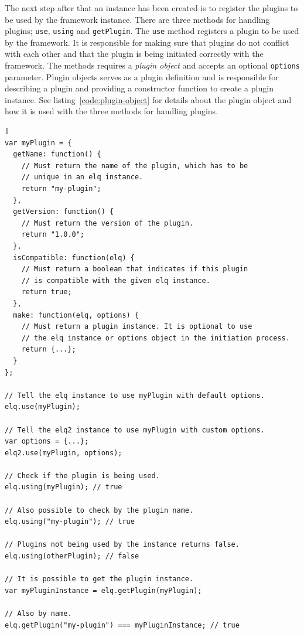 \documentclass[a4paper,11pt]{kth-mag}
\newcommand{\code}[1]{\texttt{#1}}
\begin{document}
          The next step after that an instance has been created is to register the plugins to be used by the framework instance.
          There are three methods for handling plugins; \code{use}, \code{using} and \code{getPlugin}.
          The \code{use} method registers a plugin to be used by the framework.
          It is responsible for making sure that plugins do not conflict with each other and that the plugin is being initiated correctly with the framework.
          The methods requires a \emph{plugin object} and accepts an optional \code{options} parameter.
          Plugin objects serves as a plugin definition and is responsible for describing a plugin and providing a constructor function to create a plugin instance.
          See listing~\ref{code:plugin-object} for details about the plugin object and how it is used with the three methods for handling plugins.

          \begin{lstlisting}[caption={Plugin object definition and examples of handling plugins.},captionpos=b,label={code:plugin-object}]]
var myPlugin = {
  getName: function() {
    // Must return the name of the plugin, which has to be 
    // unique in an elq instance.
    return "my-plugin";
  },
  getVersion: function() {
    // Must return the version of the plugin.
    return "1.0.0";
  },
  isCompatible: function(elq) {
    // Must return a boolean that indicates if this plugin
    // is compatible with the given elq instance.
    return true;
  },
  make: function(elq, options) {
    // Must return a plugin instance. It is optional to use
    // the elq instance or options object in the initiation process.
    return {...};
  }
};

// Tell the elq instance to use myPlugin with default options.
elq.use(myPlugin);

// Tell the elq2 instance to use myPlugin with custom options.
var options = {...};
elq2.use(myPlugin, options);

// Check if the plugin is being used.
elq.using(myPlugin); // true

// Also possible to check by the plugin name.
elq.using("my-plugin"); // true

// Plugins not being used by the instance returns false.
elq.using(otherPlugin); // false

// It is possible to get the plugin instance.
var myPluginInstance = elq.getPlugin(myPlugin);

// Also by name.
elq.getPlugin("my-plugin") === myPluginInstance; // true
          \end{lstlisting}
\end{document}
